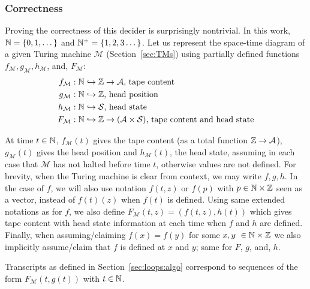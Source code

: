 \subsubsection{Correctness}
Proving the correctness of this decider is surprisingly nontrivial. In this work, $\mathbb{N} = \{0,1,\dots\}$ and $\mathbb{N}^+ = \{1,2,3\dots\}$. Let us represent the space-time diagram of a given Turing machine $\mathcal{M}$ (Section~\ref{sec:TMs}) using partially defined functions $f_\mathcal{M},g_\mathcal{M},h_\mathcal{M}$, and, $F_\mathcal{M}$:
\begin{align*}
    f_\mathcal{M} & : \mathbb{N} \hookrightarrow \mathbb{Z} \to \mathcal{A}\text{, tape content}                                \\
    g_\mathcal{M} & : \mathbb{N} \hookrightarrow \mathbb{Z}\text{, head position}                                             \\
    h_\mathcal{M} & : \mathbb{N} \hookrightarrow \mathcal{S}\text{, head state}                                           \\
    F_\mathcal{M} & : \mathbb{N} \hookrightarrow \mathbb{Z} \to (\mathcal{A}\times \mathcal{S})\text{, tape content and head state}
\end{align*}

\newcommand{\baref}{F}

At time $t\in\mathbb{N}$, $f_\mathcal{M}(t)$ gives the tape content (as a total function $\mathbb{Z} \to \mathcal{A}$), $g_\mathcal{M}(t)$ gives the head position and $h_\mathcal{M}(t)$, the head state, assuming in each case that $\mathcal{M}$ has not halted before time $t$, otherwise values are not defined. For brevity, when the Turing machine is clear from context, we may write $f,g,h$. In the case of $f$, we will also use notation $f(t,z)$ or $f(p)$ with $p \in \mathbb{N} \times \mathbb{Z}$ seen as a vector, instead of $f(t)(z)$ when $f(t)$ is defined. Using same extended notations as for $f$, we also define $\baref_\mathcal{M}(t,z) = (f(t,z),h(t))$ which gives tape content with head state information at each time when $f$ and $h$ are defined.
Finally, when assuming/claiming $f(x) = f(y)$ for some $x,y \in \N \times \Z$ we also implicitly assume/claim that $f$ is defined at $x$ and $y$; same for $\baref$, $g$, and, $h$.

Transcripts as defined in Section~\ref{sec:loops:algo} correspond to sequences of the form $F_\mathcal{M}(t,g(t))$ with $t\in\mathbb{N}$.


